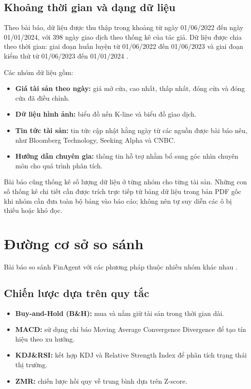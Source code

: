\subsection{Khoảng thời gian và dạng dữ liệu}
Theo bài báo, dữ liệu được thu thập trong khoảng từ ngày 01/06/2022 đến ngày 01/01/2024, với 398 ngày giao dịch theo thống kê của tác giả. Dữ liệu được chia theo thời gian: giai đoạn huấn luyện từ 01/06/2022 đến 01/06/2023 và giai đoạn kiểm thử từ 01/06/2023 đến 01/01/2024 \cite{zhang2024finagent}.

Các nhóm dữ liệu gồm:
\begin{itemize}
    \item \textbf{Giá tài sản theo ngày:} giá mở cửa, cao nhất, thấp nhất, đóng cửa và đóng cửa đã điều chỉnh.
    \item \textbf{Dữ liệu hình ảnh:} biểu đồ nến K-line và biểu đồ giao dịch.
    \item \textbf{Tin tức tài sản:} tin tức cập nhật hằng ngày từ các nguồn được bài báo nêu, như Bloomberg Technology, Seeking Alpha và CNBC.
    \item \textbf{Hướng dẫn chuyên gia:} thông tin hỗ trợ nhằm bổ sung góc nhìn chuyên môn cho quá trình phân tích.
\end{itemize}
Bài báo cũng thống kê số lượng dữ liệu ở từng nhóm cho từng tài sản. Những con số thống kê chi tiết cần được trích trực tiếp từ bảng dữ liệu trong bản PDF gốc khi nhóm cần đưa toàn bộ bảng vào báo cáo; không nên tự suy diễn các ô bị thiếu hoặc khó đọc.

\section{Đường cơ sở so sánh}

Bài báo so sánh FinAgent với các phương pháp thuộc nhiều nhóm khác nhau \cite{zhang2024finagent}.

\subsection{Chiến lược dựa trên quy tắc}
\begin{itemize}
    \item \textbf{Buy-and-Hold (B\&H):} mua và nắm giữ tài sản trong thời gian dài.
    \item \textbf{MACD:} sử dụng chỉ báo Moving Average Convergence Divergence để tạo tín hiệu theo xu hướng.
    \item \textbf{KDJ\&RSI:} kết hợp KDJ và Relative Strength Index để phân tích trạng thái thị trường.
    \item \textbf{ZMR:} chiến lược hồi quy về trung bình dựa trên Z-score.
\end{itemize}

